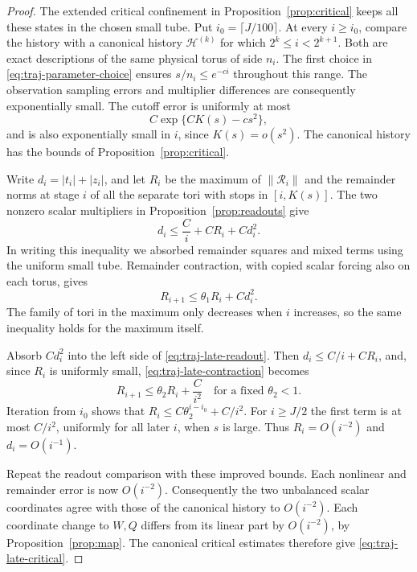 \begin{proof}
The extended critical confinement in Proposition~\ref{prop:critical}
keeps all these states in the chosen small tube.  Put
\(i_0=\lceil J/100\rceil\).  At every \(i\ge i_0\), compare the
history with a canonical history \(\mathcal H^{(k)}\) for which
\(2^k\le i<2^{k+1}\).  Both are exact descriptions of the same
physical torus of side \(n_i\).  The first choice in
\eqref{eq:traj-parameter-choice} ensures
\(s/n_i\le e^{-ci}\) throughout this range.  The observation
sampling errors and multiplier differences are consequently
exponentially small.  The cutoff error is uniformly at most
\[
 C\exp\{CK(s)-cs^2\},
\]
and is also exponentially small in \(i\), since \(K(s)=o(s^2)\).
The canonical history has the bounds of
Proposition~\ref{prop:critical}.

Write \(d_i=|t_i|+|z_i|\), and let \(R_i\) be the maximum of
\(\|\mathcal R_i\|\) and the remainder norms at stage \(i\)
of all the separate tori with stops in \([i,K(s)]\).  The two
nonzero scalar multipliers in Proposition~\ref{prop:readouts} give
\begin{equation}\label{eq:traj-late-readout}
 d_i\le\frac Ci+CR_i+Cd_i^2.
\end{equation}
In writing this inequality we absorbed remainder squares and mixed
terms using the uniform small tube.  Remainder contraction, with
copied scalar forcing also on each torus, gives
\begin{equation}\label{eq:traj-late-contraction}
 R_{i+1}\le\theta_1R_i+Cd_i^2.
\end{equation}
The family of tori in the maximum only decreases when \(i\)
increases, so the same inequality holds for the maximum itself.

Absorb \(Cd_i^2\) into the left side of
\eqref{eq:traj-late-readout}.  Then
\(d_i\le C/i+CR_i\), and, since \(R_i\) is uniformly small,
\eqref{eq:traj-late-contraction} becomes
\[
 R_{i+1}\le\theta_2R_i+\frac C{i^2}
 \quad\text{for a fixed }\theta_2<1.
\]
Iteration from \(i_0\) shows that
\(R_i\le C\theta_2^{i-i_0}+C/i^2\).  For \(i\ge J/2\) the
first term is at most \(C/i^2\), uniformly for all later \(i\),
when \(s\) is large.  Thus \(R_i=O(i^{-2})\) and
\(d_i=O(i^{-1})\).

Repeat the readout comparison with these improved bounds.  Each
nonlinear and remainder error is now \(O(i^{-2})\).  Consequently
the two unbalanced scalar coordinates agree with those of the
canonical history to \(O(i^{-2})\).  Each coordinate change to
\(W,Q\) differs from its linear part by \(O(i^{-2})\), by
Proposition~\ref{prop:map}.  The canonical critical estimates
therefore give \eqref{eq:traj-late-critical}.
\end{proof}

